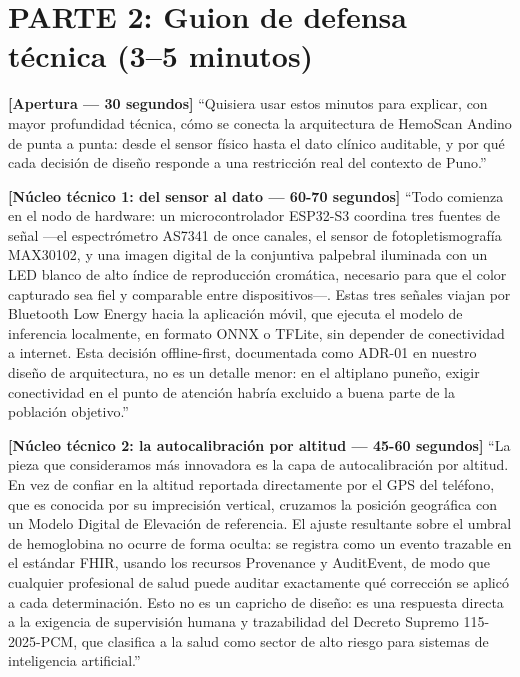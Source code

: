 \documentclass[11pt,a4paper]{article}
\begin{document}
\section{PARTE 2: Guion de defensa técnica (3--5 minutos)}\label{parte-2-guion-de-defensa-tuxe9cnica-35-minutos}

\textbf{{[}Apertura --- 30 segundos{]}}
``Quisiera usar estos minutos para explicar, con mayor profundidad técnica, cómo se conecta la arquitectura de HemoScan Andino de punta a punta: desde el sensor físico hasta el dato clínico auditable, y por qué cada decisión de diseño responde a una restricción real del contexto de Puno.''

\textbf{{[}Núcleo técnico 1: del sensor al dato --- 60-70 segundos{]}}
``Todo comienza en el nodo de hardware: un microcontrolador ESP32-S3 coordina tres fuentes de señal ---el espectrómetro AS7341 de once canales, el sensor de fotopletismografía MAX30102, y una imagen digital de la conjuntiva palpebral iluminada con un LED blanco de alto índice de reproducción cromática, necesario para que el color capturado sea fiel y comparable entre dispositivos---. Estas tres señales viajan por Bluetooth Low Energy hacia la aplicación móvil, que ejecuta el modelo de inferencia localmente, en formato ONNX o TFLite, sin depender de conectividad a internet. Esta decisión offline-first, documentada como ADR-01 en nuestro diseño de arquitectura, no es un detalle menor: en el altiplano puneño, exigir conectividad en el punto de atención habría excluido a buena parte de la población objetivo.''

\textbf{{[}Núcleo técnico 2: la autocalibración por altitud --- 45-60 segundos{]}}
``La pieza que consideramos más innovadora es la capa de autocalibración por altitud. En vez de confiar en la altitud reportada directamente por el GPS del teléfono, que es conocida por su imprecisión vertical, cruzamos la posición geográfica con un Modelo Digital de Elevación de referencia. El ajuste resultante sobre el umbral de hemoglobina no ocurre de forma oculta: se registra como un evento trazable en el estándar FHIR, usando los recursos Provenance y AuditEvent, de modo que cualquier profesional de salud puede auditar exactamente qué corrección se aplicó a cada determinación. Esto no es un capricho de diseño: es una respuesta directa a la exigencia de supervisión humana y trazabilidad del Decreto Supremo 115-2025-PCM, que clasifica a la salud como sector de alto riesgo para sistemas de inteligencia artificial.''
\end{document}
